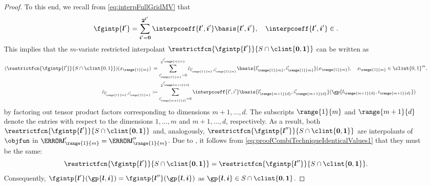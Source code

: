 \begin{proof}
  To this end, we recall from \eqref{eq:interpFullGridMV} that
  \begin{equation}
    \fgintp{\*l'}
    = \sum_{\*i'=\*0}^{\*2^{\*l'}} \interpcoeff{\*l',\*i'}
    \basis{\*l',\*i'},\quad
    \interpcoeff{\*l',\*i'} \in \real.
  \end{equation}
  This implies that the $m$-variate restricted interpolant
  $\restrictfcn{\fgintp{\*l'}}{S \cap \clint{\*0, \*1}}$ can be written as
  \begin{subequations}
    \begin{align}
      (\restrictfcn{\fgintp{\*l'}}{S \cap \clint{\*0, \*1}})
      (\*x_{\range{1}{m}})
      &\mathrel{\righthphantom{=}{\ceq}}
      \sum_{\*i'_{\range{1}{m}}=\*0}^{\*2^{\*l'_{\range{1}{m}}}}
      \interpcoefftilde{\*l'_{\range{1}{m}},\*i'_{\range{1}{m}}}
      \basis{\*l'_{\range{1}{m}},\*i'_{\range{1}{m}}}(\*x_{\range{1}{m}}),\quad
      \*x_{\range{1}{m}} \in \clint{0, 1}^m,\\
      \interpcoefftilde{\*l'_{\range{1}{m}},\*i'_{\range{1}{m}}}
      &\ceq \sum_{\*i'_{\range{m+1}{d}}=\*0}^{\*2^{\*l'_{\range{m+1}{d}}}}
      \interpcoeff{\*l',\*i'}
      \basis{\*l'_{\range{m+1}{d}},\*i'_{\range{m+1}{d}}}%
      (\gp{\*l_{\range{m+1}{d}},\*i_{\range{m+1}{d}}})
    \end{align}
  \end{subequations}
  by factoring out tensor product factors corresponding to dimensions
  $m + 1, \dotsc, d$.
  The subscripts $\range{1}{m}$ and $\range{m+1}{d}$ denote
  the entries with respect to the dimensions $1, \dotsc, m$ and
  $m + 1, \dotsc, d$, respectively.
  As a result,
  both $\restrictfcn{\fgintp{\*l'}}{S \cap \clint{\*0, \*1}}$
  and, analogously,
  $\restrictfcn{\fgintp{\*l''}}{S \cap \clint{\*0, \*1}}$
  are interpolants of $\objfun$ in
  $\ns{\*l'_{\range{1}{m}}} = \ns{\*l''_{\range{1}{m}}}$.
  Due to ,
  it follows from \eqref{eq:proofCombiTechniqueIdenticalValues1}
  that they must be the same:
  \begin{equation}
    \restrictfcn{\fgintp{\*l'}}{S \cap \clint{\*0, \*1}}
    = \restrictfcn{\fgintp{\*l''}}{S \cap \clint{\*0, \*1}}.
  \end{equation}
  Consequently, $\fgintp{\*l'}(\gp{\*l,\*i}) = \fgintp{\*l''}(\gp{\*l,\*i})$
  as $\gp{\*l,\*i} \in S \cap \clint{\*0, \*1}$.
\end{proof}

\lemmaCombiTechniqueCharacterization*

